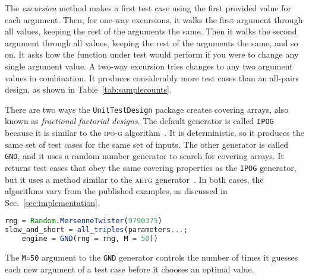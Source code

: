 \documentclass{juliacon}
\newcommand{\utd}{\texttt{UnitTestDesign}\xspace}
\begin{document}
\vskip 6pt
The \emph{excursion} method makes a first test case using the first provided value for each argument. Then, for one-way excursions, it walks the first argument through all values, keeping the rest of the arguments the same. Then it walks the second argument through all values, keeping the rest of the arguments the same, and so on. It asks how the function under test would perform if you were to change any single argument value. A two-way excursion tries changes to any two argument values in combination. It produces considerably more test cases than an all-pairs design, as shown in Table~\ref{tab:samplecounts}.

\begin{table}
\end{table}

\vskip 6pt
There are two ways the \utd package creates covering arrays, also known as \emph{fractional factorial designs}. The default generator is called \verb|IPOG| because it is similar to the \textsc{ipo-g} algorithm~\cite{Lei2008-xt}. It is deterministic, so it produces the same set of test cases for the same set of inputs. The other generator is called \verb|GND|, and it uses a random number generator to search for covering arrays. It returns test cases that obey the same covering properties as the \verb|IPOG| generator, but it uses a method similar to the \textsc{aetg} generator~\cite{Cohen1997-lb}. In both cases, the algorithms vary from the published examples, as discussed in Sec.~\ref{sec:implementation}.
\begin{lstlisting}[language=Julia]
rng = Random.MersenneTwister(9790375)
slow_and_short = all_triples(parameters...;
    engine = GND(rng = rng, M = 50))
\end{lstlisting}
The \verb|M=50| argument to the \verb|GND| generator controls the number of times it guesses each new argument of a test case before it chooses an optimal value.
\end{document}
